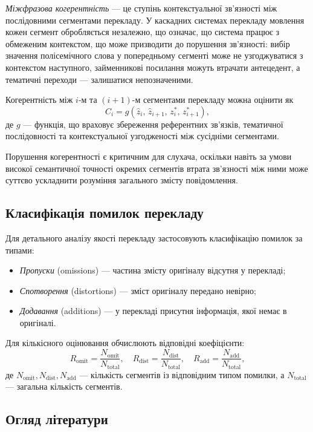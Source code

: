 \textit{Міжфразова когерентність} --- це ступінь контекстуальної зв'язності між
послідовними сегментами перекладу. У каскадних системах перекладу мовлення кожен
сегмент обробляється незалежно, що означає, що система працює з
обмеженим контекстом, що може призводити до порушення зв'язності: вибір
значення полісемічного слова у попередньому сегменті може не узгоджуватися з
контекстом наступного, займенникові посилання можуть втрачати антецедент, а
тематичні переходи --- залишатися непозначеними.

Когерентність між $i$-м та $(i+1)$-м сегментами перекладу можна оцінити як
\[
C_i = g(\hat{z}_i,\, \hat{z}_{i+1},\, z^*_i,\, z^*_{i+1}),
\]
де $g$ --- функція, що враховує збереження референтних зв'язків, тематичної
послідовності та контекстуальної узгодженості між сусідніми сегментами.

Порушення когерентності є критичним для слухача, оскільки навіть за умови
високої семантичної точності окремих сегментів втрата зв'язності між ними може
суттєво ускладнити розуміння загального змісту повідомлення.

\subsection{Класифікація помилок перекладу}
\label{subsec:error_class}

Для детального аналізу якості перекладу застосовують класифікацію помилок за
типами:
\begin{itemize}[nosep]
    \item \textit{Пропуски} (omissions) --- частина змісту оригіналу відсутня у
    перекладі;
    \item \textit{Спотворення} (distortions) --- зміст оригіналу передано невірно;
    \item \textit{Додавання} (additions) --- у перекладі присутня інформація,
    якої немає в оригіналі.
\end{itemize}

Для кількісного оцінювання обчислюють відповідні коефіцієнти:
\[
R_{\text{omit}} = \frac{N_{\text{omit}}}{N_{\text{total}}}, \quad
R_{\text{dist}} = \frac{N_{\text{dist}}}{N_{\text{total}}}, \quad
R_{\text{add}} = \frac{N_{\text{add}}}{N_{\text{total}}},
\]
де $N_{\text{omit}}, N_{\text{dist}}, N_{\text{add}}$ --- кількість сегментів із
відповідним типом помилки, а $N_{\text{total}}$ --- загальна кількість сегментів.

\subsection{Огляд літератури}

